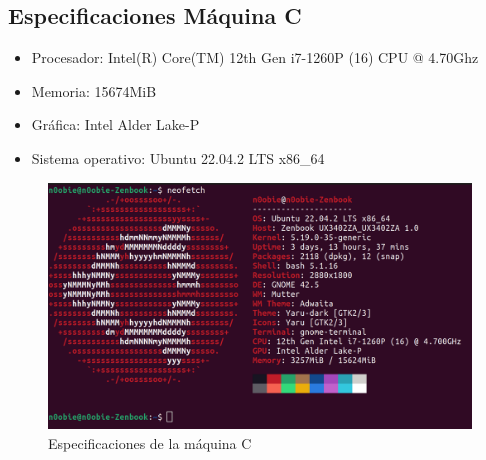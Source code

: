 \subsection{Especificaciones Máquina C}
\label{maquina_C}
\begin{itemize}
    \item Procesador: Intel(R) Core(TM) 12th Gen i7-1260P (16) CPU @ 4.70Ghz
    \item Memoria: 15674MiB
    \item Gráfica: Intel Alder Lake-P
    \item Sistema operativo: Ubuntu 22.04.2 LTS x86\_64
\end{itemize}
\begin{figure}[ht!]
    \centering
    \includegraphics[width=12cm]{archivos/img/anexos/maquinaC.png}
    \caption{Especificaciones de la máquina C}
    \label{fig:maquinaC}
\end{figure}
